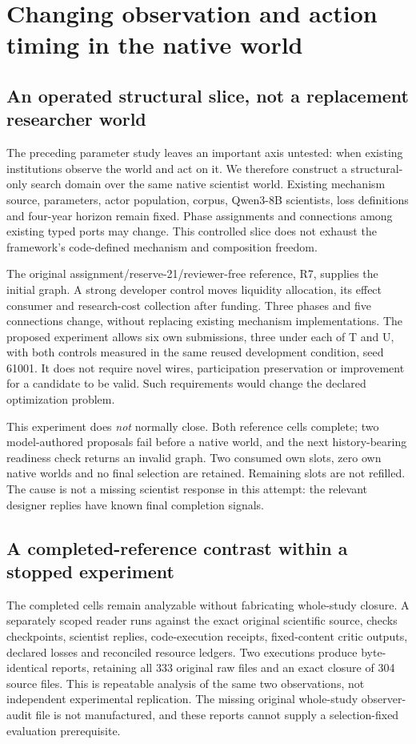 \section{Changing observation and action timing in the native world}
\label{sec:native-workflow-controls}
\subsection{An operated structural slice, not a replacement researcher world}
The preceding parameter study leaves an important axis untested: when existing
institutions observe the world and act on it. We therefore construct a
structural-only search domain over the same native scientist world. Existing
mechanism source, parameters, actor population, corpus, Qwen3-8B scientists,
loss definitions and four-year horizon remain fixed. Phase assignments and
connections among existing typed ports may change. This controlled slice does
not exhaust the framework's code-defined mechanism and composition freedom.

The original assignment/reserve-21/reviewer-free reference, R7, supplies the
initial graph. A strong developer control moves liquidity allocation, its
effect consumer and research-cost collection after funding. Three phases and
five connections change, without replacing existing mechanism implementations.
The proposed experiment allows six own submissions, three under each of T and
U, with both controls measured in the same reused development condition,
seed 61001. It does not require novel wires, participation preservation or
improvement for a candidate to be valid. Such requirements would change the
declared optimization problem.

This experiment does \emph{not} normally close. Both reference cells complete;
two model-authored proposals fail before a native world, and the next
history-bearing readiness check returns an invalid graph. Two consumed own
slots, zero own native worlds and no final selection are retained. Remaining
slots are not refilled. The cause is not a missing scientist response in this
attempt: the relevant designer replies have known final completion signals.

\subsection{A completed-reference contrast within a stopped experiment}
The completed cells remain analyzable without fabricating whole-study closure.
A separately scoped reader runs against the exact original scientific source,
checks checkpoints, scientist replies, code-execution receipts, fixed-content
critic outputs, declared losses and reconciled resource ledgers. Two executions
produce byte-identical reports, retaining all 333 original raw files and an
exact closure of 304 source files. This is repeatable analysis of the same two
observations, not independent experimental replication. The missing original
whole-study observer-audit file is not manufactured, and these reports cannot
supply a selection-fixed evaluation prerequisite.

